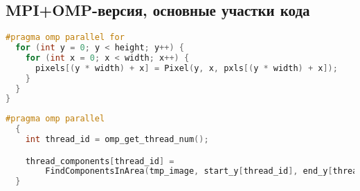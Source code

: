 \documentclass[12pt]{article}
\begin{document}
\newpage

\subsection{MPI+OMP-версия, основные участки кода}
\label{appendix:mpi_1}
\begin{lstlisting}[language=C++, caption={MPI+OMP-версия, Создание объекта Image в конструкторе Image::Image()}]
#pragma omp parallel for
  for (int y = 0; y < height; y++) {
    for (int x = 0; x < width; x++) {
      pixels[(y * width) + x] = Pixel(y, x, pxls[(y * width) + x]);
    }
  }
}
\end{lstlisting}
\label{appendix:mpi_2}
\begin{lstlisting}[language=C++, caption={MPI+OMP-версия, Поиск компонент по "полосам" изображения в функции FindComponentsOMP()}]
#pragma omp parallel
  {
    int thread_id = omp_get_thread_num();

    thread_components[thread_id] =
        FindComponentsInArea(tmp_image, start_y[thread_id], end_y[thread_id], index_offset[thread_id]);
  }
\end{lstlisting}
\label{appendix:mpi_3}
\end{document}
